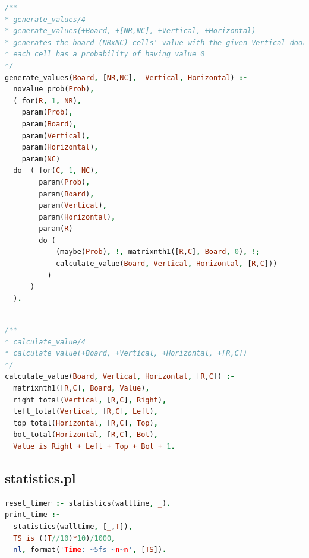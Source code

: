 \documentclass[runningheads]{llncs}
\begin{document}
\begin{center}
\begin{minipage}{0.85\textwidth}
\centering\ttfamily
\begin{lstlisting}[language=Prolog]
/**
* generate_values/4
* generate_values(+Board, +[NR,NC], +Vertical, +Horizontal)
* generates the board (NRxNC) cells' value with the given Vertical doors and Horizontal doors
* each cell has a probability of having value 0
*/
generate_values(Board, [NR,NC],  Vertical, Horizontal) :-
  novalue_prob(Prob),
  ( for(R, 1, NR),
    param(Prob),
    param(Board),
    param(Vertical),
    param(Horizontal),
    param(NC)
  do  ( for(C, 1, NC),
        param(Prob),
        param(Board),
        param(Vertical),
        param(Horizontal),
        param(R)
        do (
            (maybe(Prob), !, matrixnth1([R,C], Board, 0), !;
            calculate_value(Board, Vertical, Horizontal, [R,C]))
          )
      )
  ).
  
\end{lstlisting}
\end{minipage}
\end{center}


\begin{center}
\begin{minipage}{0.85\textwidth}
\centering\ttfamily
\begin{lstlisting}[language=Prolog]
/**
* calculate_value/4
* calculate_value(+Board, +Vertical, +Horizontal, +[R,C])
*/
calculate_value(Board, Vertical, Horizontal, [R,C]) :-
  matrixnth1([R,C], Board, Value),
  right_total(Vertical, [R,C], Right),
  left_total(Vertical, [R,C], Left),
  top_total(Horizontal, [R,C], Top),
  bot_total(Horizontal, [R,C], Bot),
  Value is Right + Left + Top + Bot + 1.


\end{lstlisting}
\end{minipage}
\end{center}

\subsection{statistics.pl}

\begin{center}
\begin{minipage}{0.85\textwidth}
\centering\ttfamily
\begin{lstlisting}[language=Prolog]
reset_timer :- statistics(walltime, _).
print_time :-
  statistics(walltime, [_,T]),
  TS is ((T//10)*10)/1000,
  nl, format('Time: ~5fs ~n~n', [TS]).

\end{lstlisting}
\end{minipage}
\end{center}
\end{document}
